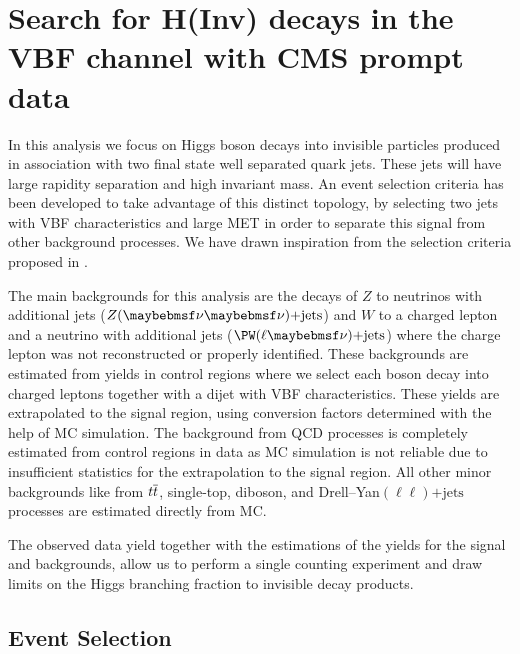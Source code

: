 \chapter{Search for H(Inv) decays in the VBF channel with CMS prompt data}
\label{CHAPTER:PromptDataAnalysis}



In this analysis we focus on Higgs boson decays into invisible particles produced in association with two final state well separated quark jets. These jets will have large rapidity separation and high invariant mass. An event selection criteria has been developed to take advantage of this distinct topology, by selecting two jets with \gls{VBF} characteristics and large \gls{MET} in order to separate this signal from other background processes. We have drawn inspiration from the selection criteria proposed in \cite{ARTICLE:Zeppenfeld_ObservingAnInvisibleHiggsboson}.

The main backgrounds for this analysis are the decays of $Z$ to neutrinos with additional jets ($\Z (\nu \nu)\text{+jets}$) and $W$ to a charged lepton and a neutrino with additional jets ($\PW (\ell \nu)\text{+jets}$) where the charge lepton was not reconstructed or properly identified. These backgrounds are estimated from yields in control regions where we select each boson decay into charged leptons together with a dijet with \gls{VBF} characteristics. These yields are extrapolated to the signal region, using conversion factors determined with the help of \gls{MC} simulation. The background from \gls{QCD} processes is completely estimated from control regions in data as \gls{MC} simulation is not reliable due to insufficient statistics for the extrapolation to the signal region. All other minor backgrounds like from $t\overline{t}$, single-top, diboson, and Drell--Yan$(\ell\ell)\text{+jets}$ processes are estimated directly from \gls{MC}. 

The observed data yield together with the estimations of the yields for the signal and backgrounds, allow us to perform a single counting experiment and draw limits on the Higgs branching fraction to invisible decay products.

\section{Event Selection}
\label{SECTION:PromptDataAnalysis_EventSelection}

